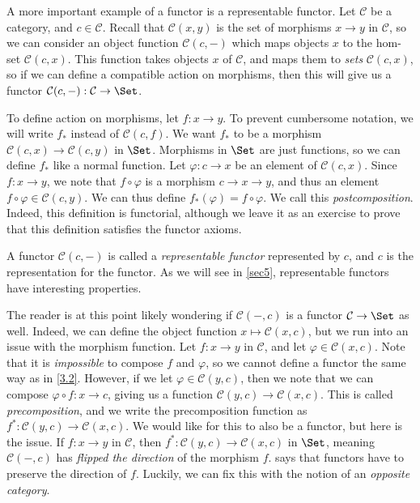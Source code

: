 \documentclass[11pt, A4]{article}
\begin{document}
\begin{example}\label{3.2}
	A more important example of a functor is a representable functor. Let $\mathcal{C} $ be a category, and $c\in \mathcal{C} $. Recall that $\mathcal{C} (x,y)$ is the set of morphisms $x\to y$ in $\mathcal{C} $, so we can consider an object function $\mathcal{C} (c,-)$ which maps objects $x$ to the hom-set $\mathcal{C} (c,x)$. This function takes objects $x$ of $\mathcal{C} $, and maps them to \emph{sets} $\mathcal{C} (c,x)$, so if we can define a compatible action on morphisms, then this will give us a functor $\mathcal{C} (c,-): \mathcal{C}  \to \Set $.

	To define action on morphisms, let $f : x \to y$. To prevent cumbersome notation, we will write $f_*$ instead of $\mathcal{C} (c,f)$. We want $f_*$ to be a morphism $\mathcal{C} (c,x)\to \mathcal{C} (c,y)$ in $\Set $. Morphisms in $\Set $ are just functions, so we can define $f_*$ like a normal function. Let $\varphi : c \to x$ be an element of $\mathcal{C} (c,x)$. Since $f : x \to y$, we note that $f\circ \varphi $ is a morphism $c\to x\to y$, and thus an element $f\circ \varphi \in \mathcal{C} (c,y)$. We can thus define $f_*(\varphi )=f\circ \varphi $. We call this \emph{postcomposition}. Indeed, this definition is functorial, although we leave it as an exercise to prove that this definition satisfies the functor axioms.
\end{example}

A functor $\mathcal{C} (c,-)$ is called a \emph{representable functor} represented by $c$, and $c$ is the representation for the functor. As we will see in \cref{sec5}, representable functors have interesting properties.

The reader is at this point likely wondering if $\mathcal{C} (-,c)$ is a functor $\mathcal{C} \to \Set $ as well. Indeed, we can define the object function $x\mapsto \mathcal{C} (x,c)$, but we run into an issue with the morphism function. Let $f : x \to y$ in $\mathcal{C} $, and let $\varphi \in \mathcal{C} (x,c)$. Note that it is \emph{impossible} to compose $f$ and $\varphi $, so we cannot define a functor the same way as in \cref{3.2}. However, if we let $\varphi \in \mathcal{C} (y,c)$, then we note that we can compose $\varphi \circ f : x \to c$, giving us a function $\mathcal{C} (y,c)\to \mathcal{C} (x,c)$. This is called \emph{precomposition}, and we write the precomposition function as $f^* : \mathcal{C} (y,c) \to \mathcal{C} (x,c)$. We would like for this to also be a functor, but here is the issue. If $f : x \to y$ in $\mathcal{C} $, then $f^*: \mathcal{C} (y,c) \to \mathcal{C} (x,c)$ in $\Set $, meaning $\mathcal{C} (-,c)$ has \emph{flipped the direction} of the morphism $f$.  says that functors have to preserve the direction of $f$. Luckily, we can fix this with the notion of an \emph{opposite category}.
\end{document}
